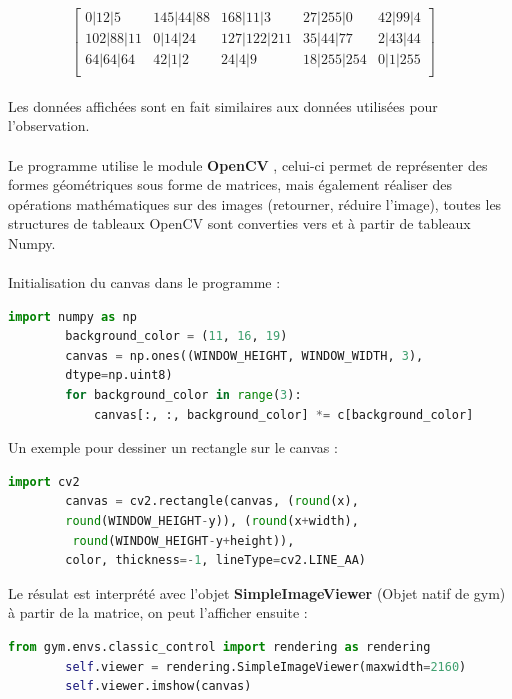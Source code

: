 \documentclass[11pt, a4paper]{article}
\begin{document}
\begin{itemize}
	$$
	\begin{bmatrix}
	0|12|5 & 145|44|88 & 168|11|3 & 27|255|0 & 42|99|4 \\ 
	102|88|11 & 0|14|24 & 127|122|211 & 35|44|77 & 2|43|44 \\ 
	64|64|64 & 42|1|2 & 24|4|9 & 18|255|254 & 0|1|255 \\ 
	\end{bmatrix}
	\quad
	$$ \\
	Les données affichées sont en fait similaires aux données utilisées pour l'observation. \\\\
	Le programme utilise le module \textbf{OpenCV} \cite{OpenCV}, celui-ci permet de représenter des formes géométriques sous forme de matrices, mais également réaliser des opérations mathématiques sur des images 
	(retourner, réduire l'image), toutes les structures de tableaux OpenCV sont converties vers et à partir de tableaux Numpy. \\ \\
	Initialisation du canvas dans le programme : \\
	\begin{lstlisting}[language=python, frame=single, gobble=4, tabsize=4]
	import numpy as np	
		background_color = (11, 16, 19)
		canvas = np.ones((WINDOW_HEIGHT, WINDOW_WIDTH, 3), 
		dtype=np.uint8)
    	for background_color in range(3):
      		canvas[:, :, background_color] *= c[background_color]
	\end{lstlisting}

	\noindent Un exemple pour dessiner un rectangle sur le canvas : \\

	\begin{lstlisting}[language=python, frame=single, gobble=4, tabsize=4]	
	import cv2
		canvas = cv2.rectangle(canvas, (round(x), 
		round(WINDOW_HEIGHT-y)), (round(x+width),
		 round(WINDOW_HEIGHT-y+height)),
		color, thickness=-1, lineType=cv2.LINE_AA)
	\end{lstlisting}
	
	Le résulat est interprété avec l'objet \textbf{SimpleImageViewer} \cite{rendering.py} (Objet natif de gym) à partir de la matrice, on peut l'afficher ensuite : \\

	\begin{lstlisting}[language=python, frame=single, gobble=4, tabsize=4]	
	from gym.envs.classic_control import rendering as rendering
		self.viewer = rendering.SimpleImageViewer(maxwidth=2160)
		self.viewer.imshow(canvas)
	\end{lstlisting}

\end{itemize}
\end{document}
